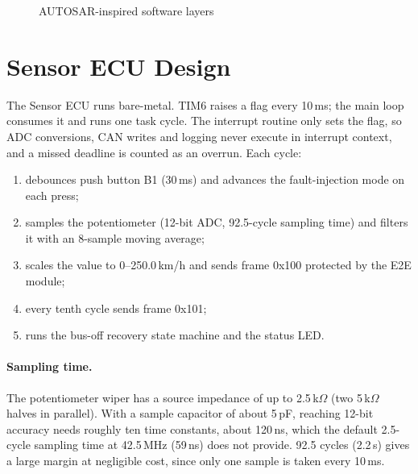 \begin{figure}[H]
\centering
{}
\caption{AUTOSAR-inspired software layers}
\label{fig:layers}
\end{figure}

\section{Sensor ECU Design}

The Sensor ECU runs bare-metal. TIM6 raises a flag every 10\,ms; the main loop consumes it and runs one task cycle. The interrupt routine only sets the flag, so ADC conversions, CAN writes and logging never execute in interrupt context, and a missed deadline is counted as an overrun. Each cycle:
\begin{enumerate}[nosep]
  \item debounces push button B1 (30\,ms) and advances the fault-injection mode on each press;
  \item samples the potentiometer (12-bit ADC, 92.5-cycle sampling time) and filters it with an 8-sample moving average;
  \item scales the value to 0--250.0\,km/h and sends frame 0x100 protected by the E2E module;
  \item every tenth cycle sends frame 0x101;
  \item runs the bus-off recovery state machine and the status LED.
\end{enumerate}

\paragraph{Sampling time.} The potentiometer wiper has a source impedance of up to 2.5\,k$\Omega$ (two 5\,k$\Omega$ halves in parallel). With a sample capacitor of about 5\,pF, reaching 12-bit accuracy needs roughly ten time constants, about 120\,ns, which the default 2.5-cycle sampling time at 42.5\,MHz (59\,ns) does not provide. 92.5 cycles (2.2\,\textmu s) gives a large margin at negligible cost, since only one sample is taken every 10\,ms.

